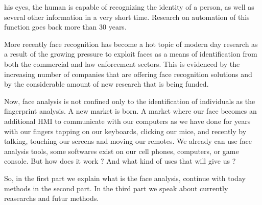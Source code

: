  his eyes, the human is capable of recognizing the identity of a person, as well as several other information in a very short time. Research on automation of this function goes back more than 30 years.

More recently face recognition has become a hot topic of modern day research as a result of the growing pressure to exploit faces as a means of identification from both the commercial and law enforcement sectors.
This is evidenced by the
increasing number of companies that are offering face recognition solutions and by the considerable
amount of new research that is being funded.

Now, face analysis is not confined only to the identification of individuals as the fingerprint analysis. A new market is born. A market where our face becomes an additional HMI to communicate with our computers as we have done for years with our fingers tapping on our keyboards, clicking our mice, and recently by talking, touching our screens and moving our remotes.
We already can use face analysis tools, some softwares exist on our cell phones, computers, or game console.
But how does it work ? And what kind of uses that will give us ?

So, in the first part we explain what is the face analysis, continue with today methods in the second part. In the third part we speak about currently reasearchs and futur methods.
